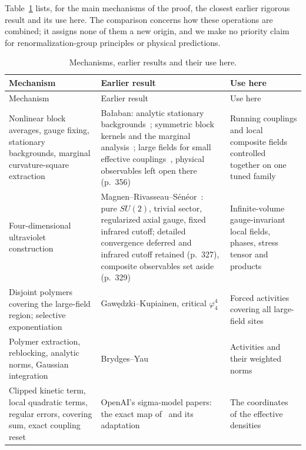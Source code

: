 Table~\ref{tab:earlier-work} lists, for the main mechanisms of the proof, the closest earlier rigorous result and its use here. The comparison concerns how these operations are combined; it assigns none of them a new origin, and we make no priority claim for renormalization-group principles or physical predictions.

\begingroup
\small
\setlength{\tabcolsep}{4pt}
\renewcommand{\arraystretch}{1.12}
\begin{longtable}{@{}p{}p{}p{}@{}}
\caption{Mechanisms, earlier results and their use here.}\label{tab:earlier-work}\\
\toprule
Mechanism & Earlier result & Use here\\
\midrule
\endfirsthead
\toprule
Mechanism & Earlier result & Use here\\
\midrule
\endhead
\bottomrule
\endfoot
Nonlinear block averages, gauge fixing, stationary backgrounds, marginal curvature-square extraction & Ba\l{}aban: analytic stationary backgrounds~\cite[Theorem~1, Proposition~6]{Balaban1985Variational}; symmetric block kernels and the marginal analysis~\cite[pp.~252--254, \S\S4--5]{Balaban1987RG}; large fields for small effective couplings~\cite[Theorem~1, p.~355]{Balaban1989Large}, physical observables left open there (p.~356) & Running couplings and local composite fields controlled together on one tuned family\\[2pt]
Four-dimensional ultraviolet construction & Magnen--Rivasseau--S\'en\'eor~\cite{MagnenRivasseauSeneor1993}: pure $SU(2)$, trivial sector, regularized axial gauge, fixed infrared cutoff; detailed convergence deferred and infrared cutoff retained (p.~327), composite observables set aside (p.~329) & Infinite-volume gauge-invariant local fields, phases, stress tensor and products\\[2pt]
Disjoint polymers covering the large-field region; selective exponentiation & Gaw\k{e}dzki--Kupiainen, critical $\varphi^4_4$~\cite[p.~212, (4.8), pp.~218--221]{GawedzkiKupiainen1985} & Forced activities covering all large-field sites\\[2pt]
Polymer extraction, reblocking, analytic norms, Gaussian integration & Brydges--Yau~\cite[\S\S1--2, pp.~378--384]{BrydgesYau1990} & Activities and their weighted norms\\[2pt]
Clipped kinetic term, local quadratic terms, regular errors, covering sum, exact coupling reset & OpenAI's sigma-model papers: the exact map of~\cite[\S5, pp.~38--55]{OpenAI2026O4} and its adaptation~\cite[\S3.3, pp.~23--28]{OpenAI2026O3} & The coordinates of the effective densities\\[2pt]

\end{longtable}
